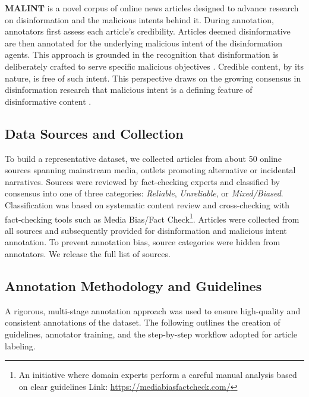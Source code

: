 \documentclass[11pt]{article}
\begin{document}
\textbf{MALINT} is a novel corpus of online news articles designed to advance research on disinformation and the malicious intents behind it. 
During annotation, annotators first assess each article’s credibility. Articles deemed disinformative are then annotated for the underlying malicious intent of the disinformation agents. This approach is grounded in the recognition that disinformation is deliberately crafted to serve specific malicious objectives \cite{hameleers2023disinformation}. Credible content, by its nature, is free of such intent. This perspective draws on the growing consensus in disinformation research that malicious intent is a defining feature of disinformative content \cite{Zhou_2022, appelman2022truth, hameleers2023disinformation, wang2024misinformation}. 

\subsection{Data Sources and Collection}\label{ssec:data_sources}

To build a representative dataset, we collected articles from about 50 online sources spanning mainstream media, outlets promoting alternative or incidental narratives. Sources were reviewed by fact-checking experts and classified by consensus into one of three categories: \textit{Reliable}, \textit{Unreliable}, or \textit{Mixed/Biased}. Classification was based on systematic content review and cross-checking with fact-checking tools such as Media Bias/Fact Check\footnote{An initiative where domain experts perform a careful manual analysis based on clear guidelines \cite{nakov2024survey} Link: \href{https://mediabiasfactcheck.com/}{https://mediabiasfactcheck.com/}}. Articles were collected from all sources and subsequently provided for disinformation and malicious intent annotation. To prevent annotation bias, source categories were hidden from annotators. We release the full list of sources.

\subsection{Annotation Methodology and Guidelines}

A rigorous, multi-stage annotation approach was used to ensure high-quality and consistent annotations of the dataset. The following outlines the creation of guidelines, annotator training, and the step-by-step workflow adopted for article labeling.
\end{document}
